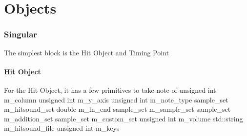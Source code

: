 \part{Objects}

\section{Singular}

The simplest block is the Hit Object and Timing Point

\subsection{Hit Object}

For the Hit Object, it has a few primitives to take note of
unsigned int m\_column
unsigned int m\_y\_axis
unsigned int m\_note\_type
sample\_set m\_hitsound\_set
double m\_ln\_end
sample\_set m\_sample\_set
sample\_set m\_addition\_set
sample\_set m\_custom\_set
unsigned int m\_volume
std::string m\_hitsound\_file
unsigned int m\_keys